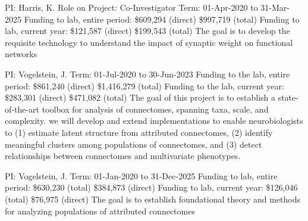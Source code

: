 \documentclass[10pt,colorlinks=true,urlcolor=blue]{moderncv}
\begin{document}
    {\newline PI: Harris, K.
    \newline Role on Project: Co-Investigator
    \newline Term: 01-Apr-2020 to 31-Mar-2025
    \newline Funding to lab, entire period: \$609,294 (direct) \$997,719 (total)
    \newline Funding to lab, current year: \$121,587 (direct) \$199,543 (total)
    \newline The goal is to develop the requisite technology to understand the impact of synaptic weight on functional networks}{}{}{}
    
    {\newline PI: Vogelstein, J.
    \newline Term: 01-Jul-2020 to 30-Jun-2023
    \newline Funding to the lab, entire period: \$861,240 (direct) \$1,416,279 (total)
    \newline Funding to the lab, current year: \$283,301 (direct) \$471,082 (total)
    \newline The goal of this project is to establish a state-of-the-art toolbox for analysis of connectomes, spanning taxa, scale, and complexity. we will develop and extend implementations to enable neurobiologists to (1) estimate latent structure from attributed connectomes, (2) identify meaningful clusters among populations of connectomes, and (3) detect relationships between connectomes and multivariate phenotypes.}{}{}{}
    
    {\newline PI: Vogelstein, J.
    \newline Term: 01-Jan-2020 to 31-Dec-2025
    \newline Funding to lab, entire period: \$630,230 (total) \$384,873 (direct)
    \newline Funding to lab, current year: \$126,046 (total) \$76,975 (direct)
    \newline The goal is to establish foundational theory and methods for analyzing populations of
    attributed connectomes}{}{}{}
    
\end{document}
